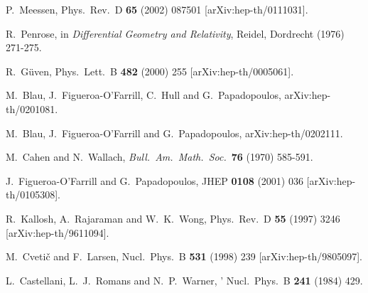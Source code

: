 \documentclass[12pt,a4paper]{article}
\begin{document}
\begin{thebibliography}{40}
P.~Meessen,
Phys.\ Rev.\ D {\bf 65} (2002) 087501
[arXiv:hep-th/0111031].

 R.~Penrose,
                  in
                  {\sl Differential Geometry and Relativity}, Reidel, 
                  Dordrecht (1976) 271-275.

R.~G\"uven,
Phys.\ Lett.\ B {\bf 482} (2000) 255
[arXiv:hep-th/0005061].

M.~Blau, J.~Figueroa-O'Farrill, C.~Hull and G.~Papadopoulos,
arXiv:hep-th/0201081.

M.~Blau, J.~Figueroa-O'Farrill and G.~Papadopoulos,
arXiv:hep-th/0202111.

 M.~Cahen and N.~Wallach,
                  {\it Bull.~Am.~Math.~Soc.}~\textbf{76} (1970) 585-591.

J.~Figueroa-O'Farrill and G.~Papadopoulos,
JHEP {\bf 0108} (2001) 036
[arXiv:hep-th/0105308].

R.~Kallosh, A.~Rajaraman and W.~K.~Wong,
Phys.\ Rev.\ D {\bf 55} (1997) 3246
[arXiv:hep-th/9611094].



M.~Cveti\v{c} and F.~Larsen,
Nucl.\ Phys.\ B {\bf 531} (1998) 239
[arXiv:hep-th/9805097].

L.~Castellani, L.~J.~Romans and N.~P.~Warner,
'
Nucl.\ Phys.\ B {\bf 241} (1984) 429.



\end{thebibliography}
\end{document}
